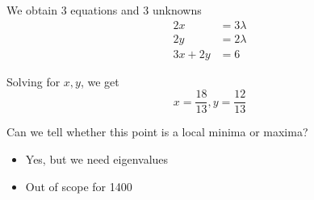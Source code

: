 We obtain 3 equations and 3 unknowns
\begin{align*}
   2x &= 3 \lambda \\
   2y &= 2 \lambda \\
   3x + 2y &= 6
\end{align*}

Solving for $x, y$, we get
\[
  x = \frac{18}{13}, y = \frac{12}{13}
\] 

Can we tell whether this point is a local minima or maxima?
\begin{itemize}
   \item Yes, but we need eigenvalues
   \item Out of scope for 1400
\end{itemize}









